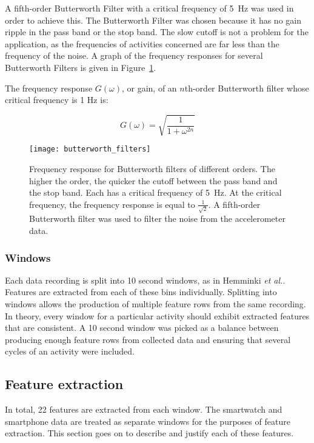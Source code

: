         A fifth-order Butterworth Filter with a critical frequency of 5~\si{Hz} was used in order to achieve this. The Butterworth Filter was chosen because it has no gain ripple in the pass band or the stop band. The slow cutoff is not a problem for the application, as the frequencies of activities concerned are far less than the frequency of the noise. A graph of the frequency responses for several Butterworth Filters is given in Figure~\ref{fig:butterworth_filters}.
        
        The frequency response $G(\omega)$, or gain, of an $n$th-order Butterworth filter whose critical frequency is 1 \si{Hz} is:
        
        $$G(\omega) = \sqrt{\frac{1}{1+\omega^{2n}}}$$
        
        \begin{figure}
          \centering
          \texttt{[image: butterworth\_filters]}
          \caption[Frequency response for Butterworth filters of different orders]{Frequency response for Butterworth filters of different orders. The higher the order, the quicker the cutoff between the pass band and the stop band. Each has a critical frequency of 5~\si{Hz}. At the critical frequency, the frequency response is equal to $\frac{1}{\sqrt{2}}$. A fifth-order Butterworth filter was used to filter the noise from the accelerometer data. }
          \label{fig:butterworth_filters}
        \end{figure}
        
      \subsubsection{Windows}
        Each data recording is split into 10 second windows, as in Hemminki \emph{et al.}\cite{hemminki2013accelerometer}. Features are extracted from each of these bins individually. Splitting into windows allows the production of multiple feature rows from the same recording. In theory, every window for a particular activity should exhibit extracted features that are consistent. A 10 second window was picked as a balance between producing enough feature rows from collected data and ensuring that several cycles of an activity were included. 
      
    \subsection{Feature extraction}
      \label{sec:feature-extraction}
      In total, 22 features are extracted from each window. The smartwatch and smartphone data are treated as separate windows for the purposes of feature extraction. This section goes on to describe and justify each of these features.
      
